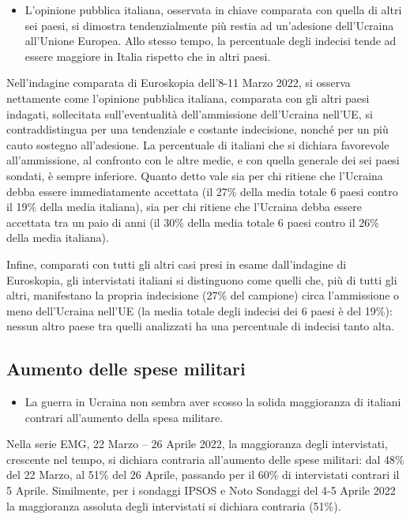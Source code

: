 \documentclass[
  openany]{book}
\providecommand{\tightlist}{%
  \setlength{\itemsep}{0pt}\setlength{\parskip}{0pt}}
\begin{document}
\begin{itemize}
\tightlist
\item
  L'opinione pubblica italiana, osservata in chiave comparata con quella di altri sei paesi, si dimostra tendenzialmente più restia ad un'adesione dell'Ucraina all'Unione Europea. Allo stesso tempo, la percentuale degli indecisi tende ad essere maggiore in Italia rispetto che in altri paesi.
\end{itemize}

Nell'indagine comparata di Euroskopia dell'8-11 Marzo 2022, si osserva nettamente come l'opinione pubblica italiana, comparata con gli altri paesi indagati, sollecitata sull'eventualità dell'ammissione dell'Ucraina nell'UE, si contraddistingua per una tendenziale e costante indecisione, nonché per un più cauto sostegno all'adesione. La percentuale di italiani che si dichiara favorevole all'ammissione, al confronto con le altre medie, e con quella generale dei sei paesi sondati, è sempre inferiore.
Quanto detto vale sia per chi ritiene che l'Ucraina debba essere immediatamente accettata (il 27\% della media totale 6 paesi contro il 19\% della media italiana), sia per chi ritiene che l'Ucraina debba essere accettata tra un paio di anni (il 30\% della media totale 6 paesi contro il 26\% della media italiana).

Infine, comparati con tutti gli altri casi presi in esame dall'indagine di Euroskopia, gli intervistati italiani si distinguono come quelli che, più di tutti gli altri, manifestano la propria indecisione (27\% del campione) circa l'ammissione o meno dell'Ucraina nell'UE (la media totale degli indecisi dei 6 paesi è del 19\%): nessun altro paese tra quelli analizzati ha una percentuale di indecisi tanto alta.

\hypertarget{aumento-delle-spese-militari}{%
\subsection{Aumento delle spese militari}\label{aumento-delle-spese-militari}}

\begin{itemize}
\tightlist
\item
  La guerra in Ucraina non sembra aver scosso la solida maggioranza di italiani contrari all'aumento della spesa militare.
\end{itemize}

Nella serie EMG, 22 Marzo -- 26 Aprile 2022, la maggioranza degli intervistati, crescente nel tempo, si dichiara contraria all'aumento delle spese militari: dal 48\% del 22 Marzo, al 51\% del 26 Aprile, passando per il 60\% di intervistati contrari il 5 Aprile. Similmente, per i sondaggi IPSOS e Noto Sondaggi del 4-5 Aprile 2022 la maggioranza assoluta degli intervistati si dichiara contraria (51\%).
\end{document}
